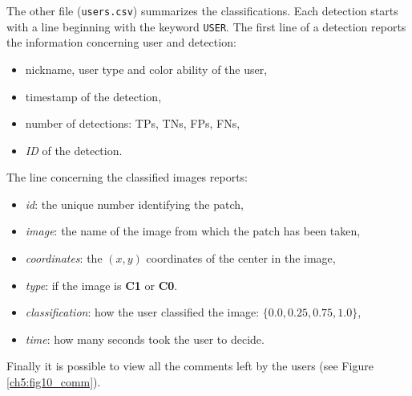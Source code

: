 \noindent The other file (\texttt{users.csv}) summarizes the classifications. Each detection starts with a line beginning with the keyword \texttt{USER}.
The first line of a detection reports the information concerning user and detection:

\begin{itemize}
 \item nickname, user type and color ability of the user,
 \item timestamp of the detection,
 \item number of detections: \Glspl{TP}, \Glspl{TN}, \Glspl{FP}, \Glspl{FN},
 \item \textit{ID} of the detection.
\end{itemize}

\noindent The line concerning the classified images reports:

\begin{itemize}
 \item \textit{id}: the unique number identifying the patch,
 \item \textit{image}: the name of the image from which the patch has been taken,
 \item \textit{coordinates}: the $(x,y)$ coordinates of the center in the image,
 \item \textit{type}: if the image is \textbf{C1} or \textbf{C0}.
 \item \textit{classification}: how the user classified the image: $\{0.0, 0.25, 0.75, 1.0\}$,
 \item \textit{time}: how many seconds took the user to decide.
\end{itemize}

\noindent Finally it is possible to view all the comments left by the users (see Figure \ref{ch5:fig10_comm}).

